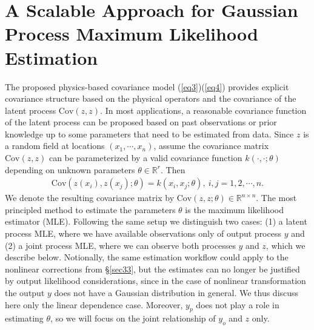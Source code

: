 \documentclass[article,ij4uq]{ij4uq}              %
\begin{document}
\section{A Scalable Approach for Gaussian Process Maximum Likelihood Estimation}\label{sec4}
\par The proposed physics-based covariance model (\ref{eq3})(\ref{eq4}) provides explicit covariance structure based on the physical operators and the covariance of the latent process $\mathrm{Cov}(z,z)$. In most applications, a reasonable covariance function of the latent process can be proposed based on past observations or prior knowledge up to some parameters that need to be estimated from data. Since $z$ is a random field at locations $(x_{1},\cdots,x_{n})$, assume the covariance matrix $\mathrm{Cov}(z,z)$ can be parameterized by a valid covariance function $k(\cdot,\cdot;\theta)$ depending on unknown parameters $\theta \in \mathbb{R}^r$. Then
\begin{align}
    \mathrm{Cov}(z(x_{i}),z(x_{j});\theta)=k(x_{i},x_{j};\theta),\ i,j=1,2,\cdots,n.\label{eq39}
\end{align}
We denote the resulting covariance matrix by $\mathrm{Cov}(z,z;\theta) \in \mathbb{R}^{n \times n}$. The most principled method to estimate the parameters $\theta$ is the maximum likelihood estimator (MLE). Following the same setup we distinguish two cases: (1) a latent process MLE, where we  have available observations only of output process $y$ and (2) a joint process MLE, where we can observe both processes $y$ and $z$, which we describe below. Notionally, the same estimation workflow could apply to the nonlinear corrections from \S \ref{sec33}, but the estimates can no longer be justified by output likelihood considerations, since in the case of nonlinear transformation the output $y$ does not have a Gaussian distribution in general. We thus discuss here only the linear dependence case. Moreover, $y_p$ does not play a role in estimating $\theta$, so we will focus on the joint relationship of $y_o$ and $z$ only. 
\end{document}
